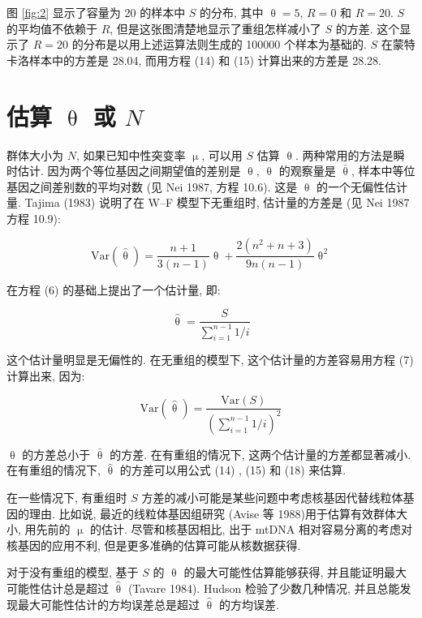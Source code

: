 \documentclass[12pt]{article}
\begin{document}
图 \ref{fig:2} 显示了容量为 20 的样本中 $S$ 的分布, 其中 $\uptheta =5$, $R=0$ 和 $R=20$. $S$ 的平均值不依赖于
$R$, 但是这张图清楚地显示了重组怎样减小了 $S$ 的方差. 这个显示了 $R=20$ 的分布是以用上述运算法则生成的 100000
个样本为基础的. $S$ 在蒙特卡洛样本中的方差是 28.04, 而用方程 (14) 和 (15) 计算出来的方差是 28.28.

\section{估算 $\uptheta$ 或 $N$}

群体大小为 $N$, 如果已知中性突变率 $\upmu$, 可以用 $S$ 估算 $\uptheta$. 两种常用的方法是瞬时估计.
因为两个等位基因之间期望值的差别是 $\uptheta$, $\uptheta$ 的观察量是 $\overset{‾}{\uptheta}$,
样本中等位基因之间差别数的平均对数 (见 Nei 1987, 方程 10.6). 这是 $\uptheta$ 的一个无偏性估计量. Tajima (1983) 说明了在
W--F 模型下无重组时, 估计量的方差是 (见 Nei 1987 方程 10.9):

\begin{equation} \label{eq:16}
    \text{Var}(\hat{\uptheta})=\frac{n+1}{3(n-1)}\uptheta + \frac{2(n^{2}+n+3)}{9n(n-1)}\uptheta^{2}
\end{equation}

\cite{watterson1975} 在方程 (6) 的基础上提出了一个估计量, 即:

\begin{equation} \label{eq:17}
    \hat{\uptheta}=\frac{S}{\sum_{i=1}^{n-1}1/i}
\end{equation}

这个估计量明显是无偏性的. 在无重组的模型下, 这个估计量的方差容易用方程 (7) 计算出来, 因为:

\begin{equation} \label{eq:18}
    \text{Var}(\hat{\uptheta})=\frac{\text{Var}(S)}{\left( \sum_{i=1}^{n-1} 1/i \right)^{2}}
\end{equation}

$\uptheta$ 的方差总小于 $\overset{‾}{\uptheta}$ 的方差. 在有重组的情况下, 这两个估计量的方差都显著减小.
在有重组的情况下, $\hat{\uptheta}$ 的方差可以用公式 (14) , (15) 和 (18) 来估算.

在一些情况下, 有重组时 $S$ 方差的减小可能是某些问题中考虑核基因代替线粒体基因的理由. 比如说, 最近的线粒体基因组研究
(Avise 等 1988)用于估算有效群体大小, 用先前的 $\upmu$ 的估计. 尽管和核基因相比, 出于 mtDNA
相对容易分离的考虑对核基因的应用不利, 但是更多准确的估算可能从核数据获得.

对于没有重组的模型, 基于 $S$ 的 $\uptheta$ 的最大可能性估算能够获得, 并且能证明最大可能性估计总是超过 $\hat{\uptheta}$
(Tavare 1984). Hudson 检验了少数几种情况, 并且总能发现最大可能性估计的方均误差总是超过 $\hat{\uptheta}$ 的方均误差.
\end{document}
